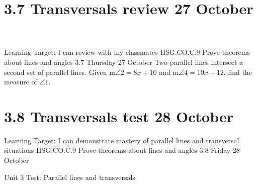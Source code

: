 \section{3.7 Transversals review \hfill 27 October \,}
\begin{frame}{Learning Target: I can review with my classmates}
  {HSG.CO.C.9 Prove theorems about lines and angles \hfill \alert{3.7 Thursday 27 October}}
  Two parallel lines intersect a second set of parallel lines. Given m$\angle 2 = 8x+10$ and m$\angle 4 = 10x - 12$, find the measure of $\angle 1$. 
  \begin{flushright}
    \end{flushright}
\end{frame}

\section{3.8 Transversals test \hfill 28 October \,}
\begin{frame}{Learning Target: I can demonstrate mastery of parallel lines and transversal situations}
  {HSG.CO.C.9 Prove theorems about lines and angles \hfill \alert{3.8 Friday 28 October \,}}

  \alert{Unit 3 Test: Parallel lines and transversals}

\end{frame}


